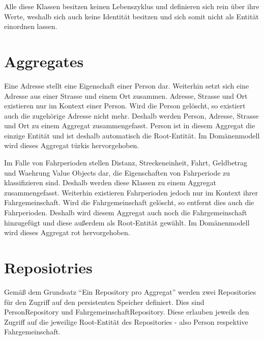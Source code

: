 Alle diese Klassen besitzen keinen Lebenszyklus und definieren sich rein über ihre Werte, weshalb sich auch keine Identität besitzen und sich somit nicht als Entität einordnen lassen.

\section{Aggregates}
Eine Adresse stellt eine Eigenschaft einer Person dar.
Weiterhin setzt sich eine Adresse aus einer Strasse und einem Ort zusammen.
Adresse, Strasse und Ort existieren nur im Kontext einer Person.
Wird die Person gelöscht, so existiert auch die zugehörige Adresse nicht mehr.
Deshalb werden Person, Adresse, Strasse und Ort zu einem Aggregat zusammengefasst.
Person ist in diesem Aggregat die einzige Entität und ist deshalb automatisch die Root-Entität.
Im Domänenmodell wird dieses Aggregat türkis hervorgehoben.

Im Falle von Fahrperioden stellen Distanz, Streckeneinheit, Fahrt, Geldbetrag und Waehrung Value Objects dar, die Eigenschaften von Fahrperiode zu klassifizieren sind.
Deshalb werden diese Klassen zu einem Aggregat zusammengefasst.
Weiterhin existieren Fahrperioden jedoch nur im Kontext ihrer Fahrgemeinschaft.
Wird die Fahrgemeinschaft gelöscht, so entfernt dies auch die Fahrperioden.
Deshalb wird diesem Aggregat auch noch die Fahrgemeinschaft hinzugefügt und diese außerdem als Root-Entität gewählt.
Im Domänenmodell wird dieses Aggregat rot hervorgehoben.

\section{Reposiotries}
Gemäß dem Grundsatz \enquote{Ein Repository pro Aggregat} werden zwei Repositories für den Zugriff auf den persistenten Speicher definiert.
Dies sind PersonRepository und FahrgemeinschaftRepository.
Diese erlauben jeweils den Zugriff auf die jeweilige Root-Entität des Repositories - also Person respektive Fahrgemeinschaft.


